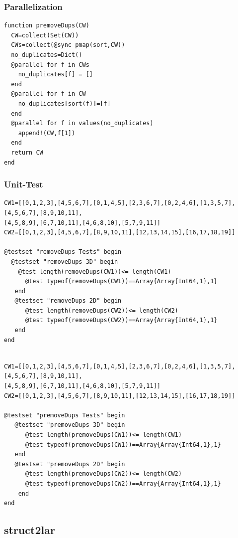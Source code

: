 \documentclass[a4paper,12pt]{article}
\begin{document}
\subsubsection{Parallelization}
\begin{Verbatim}[fontsize=\footnotesize]
function premoveDups(CW)
  CW=collect(Set(CW))
  CWs=collect(@sync pmap(sort,CW))
  no_duplicates=Dict()
  @parallel for f in CWs
    no_duplicates[f] = []
  end
  @parallel for f in CW
    no_duplicates[sort(f)]=[f]
  end
  @parallel for f in values(no_duplicates)
    append!(CW,f[1])
  end
  return CW
end
\end{Verbatim}
\subsubsection{Unit-Test}
\begin{Verbatim}[fontsize=\footnotesize]
CW1=[[0,1,2,3],[4,5,6,7],[0,1,4,5],[2,3,6,7],[0,2,4,6],[1,3,5,7],[4,5,6,7],[8,9,10,11],
[4,5,8,9],[6,7,10,11],[4,6,8,10],[5,7,9,11]]
CW2=[[0,1,2,3],[4,5,6,7],[8,9,10,11],[12,13,14,15],[16,17,18,19]]

@testset "removeDups Tests" begin
  @testset "removeDups 3D" begin
    @test length(removeDups(CW1))<= length(CW1)
      @test typeof(removeDups(CW1))==Array{Array{Int64,1},1}
   end
   @testset "removeDups 2D" begin
      @test length(removeDups(CW2))<= length(CW2)
      @test typeof(removeDups(CW2))==Array{Array{Int64,1},1}
   end
end

\end{Verbatim}
\begin{Verbatim}[fontsize=\footnotesize]

CW1=[[0,1,2,3],[4,5,6,7],[0,1,4,5],[2,3,6,7],[0,2,4,6],[1,3,5,7],[4,5,6,7],[8,9,10,11],
[4,5,8,9],[6,7,10,11],[4,6,8,10],[5,7,9,11]]
CW2=[[0,1,2,3],[4,5,6,7],[8,9,10,11],[12,13,14,15],[16,17,18,19]]

@testset "premoveDups Tests" begin
   @testset "premoveDups 3D" begin
      @test length(premoveDups(CW1))<= length(CW1)
      @test typeof(premoveDups(CW1))==Array{Array{Int64,1},1}
   end
   @testset "premoveDups 2D" begin
      @test length(premoveDups(CW2))<= length(CW2)
      @test typeof(premoveDups(CW2))==Array{Array{Int64,1},1}
    end
end
\end{Verbatim}
\newpage
\subsection{struct2lar}
\end{document}
